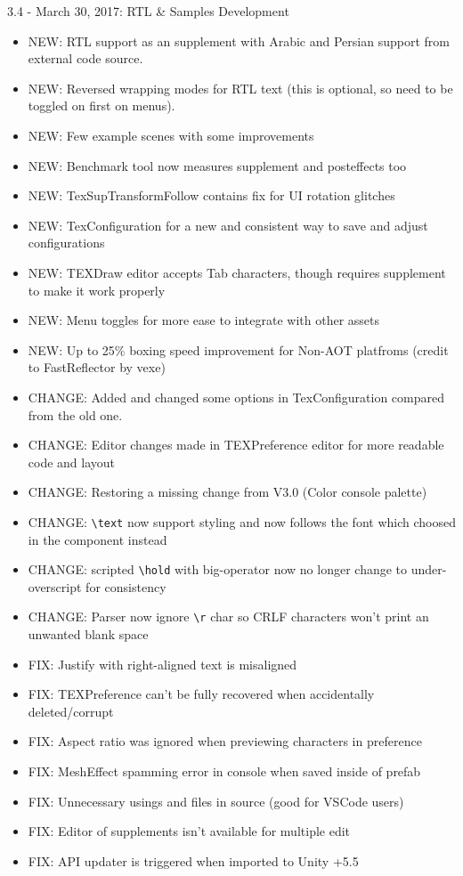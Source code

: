\documentclass[12pt]{article}
\begin{document}
3.4 - March 30, 2017: RTL \& Samples Development
\begin{itemize}
\item NEW: RTL support as an supplement with Arabic and Persian support from external code source.
\item NEW: Reversed wrapping modes for RTL text (this is optional, so need to be toggled on first on menus).
\item NEW: Few example scenes with some improvements
\item NEW: Benchmark tool now measures supplement and posteffects too
\item NEW: TexSupTransformFollow contains fix for UI rotation glitches
\item NEW: TexConfiguration for a new and consistent way to save and adjust configurations
\item NEW: TEXDraw editor accepts Tab characters, though requires supplement to make it work properly
\item NEW: Menu toggles for more ease to integrate with other assets
\item NEW: Up to 25\% boxing speed improvement for Non-AOT platfroms (credit to FastReflector by vexe)
\item CHANGE: Added and changed some options in TexConfiguration compared from the old one.
\item CHANGE: Editor changes made in TEXPreference editor for more readable code and layout
\item CHANGE: Restoring a missing change from V3.0 (Color console palette)
\item CHANGE: \verb|\text| now support styling and now follows the font which choosed in the component instead
\item CHANGE: scripted \verb|\hold| with big-operator now no longer change to under-overscript for consistency
\item CHANGE: Parser now ignore \verb|\r| char so CRLF characters won't print an unwanted blank space
\item FIX: Justify with right-aligned text is misaligned
\item FIX: TEXPreference can't be fully recovered when accidentally deleted/corrupt
\item FIX: Aspect ratio was ignored when previewing characters in preference
\item FIX: MeshEffect spamming error in console when saved inside of prefab
\item FIX: Unnecessary usings and files in source (good for VSCode users)
\item FIX: Editor of supplements isn't available for multiple edit
\item FIX: API updater is triggered when imported to Unity +5.5
\end{itemize}
\end{document}
